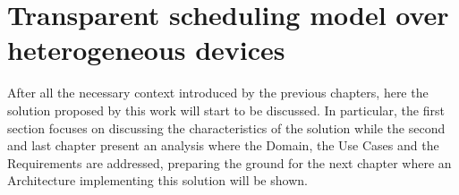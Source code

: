 \chapter{Transparent scheduling model over heterogeneous devices}
After all the necessary context introduced by the previous chapters, here the solution proposed by this work will start to be discussed. In particular, the first section focuses on discussing the characteristics of the solution while the second and last chapter present an analysis where the Domain, the Use Cases and the Requirements are addressed, preparing the ground for the next chapter where an Architecture implementing this solution will be shown.


